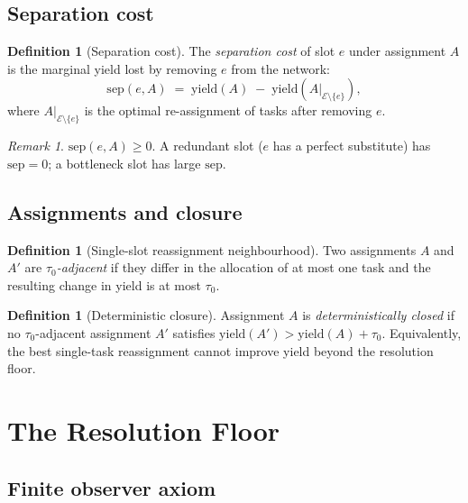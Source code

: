\documentclass[11pt,twocolumn,a4paper]{article}
\theoremstyle{plain}
\theoremstyle{definition}
\newtheorem{definition}[theorem]{Definition}
\theoremstyle{remark}
\newtheorem{remark}[theorem]{Remark}
\newcommand{\E}{\mathcal{E}}
\newcommand{\tick}{\tau_0}
\newcommand{\sep}{\mathrm{sep}}
\newcommand{\yield}{\mathrm{yield}}
\begin{document}
\subsection{Separation cost}

\begin{definition}[Separation cost]
\label{def:sep}
The \emph{separation cost} of slot $e$ under assignment $A$ is the marginal yield lost by removing $e$ from the network:
\[
  \sep(e, A) \;=\; \yield(A) \;-\; \yield(A|_{\E \setminus \{e\}}),
\]
where $A|_{\E \setminus \{e\}}$ is the optimal re-assignment of tasks after removing $e$.
\end{definition}

\begin{remark}
$\sep(e, A) \geq 0$. A redundant slot ($e$ has a perfect substitute) has $\sep = 0$; a bottleneck slot has large $\sep$.
\end{remark}

\subsection{Assignments and closure}

\begin{definition}[Single-slot reassignment neighbourhood]
\label{def:neighborhood}
Two assignments $A$ and $A'$ are \emph{$\tick$-adjacent} if they differ in the allocation of at most one task and the resulting change in yield is at most $\tick$.
\end{definition}

\begin{definition}[Deterministic closure]
\label{def:closure}
Assignment $A$ is \emph{deterministically closed} if no $\tick$-adjacent assignment $A'$ satisfies $\yield(A') > \yield(A) + \tick$. Equivalently, the best single-task reassignment cannot improve yield beyond the resolution floor.
\end{definition}

\section{The Resolution Floor}
\label{sec:floor}

\subsection{Finite observer axiom}
\end{document}
